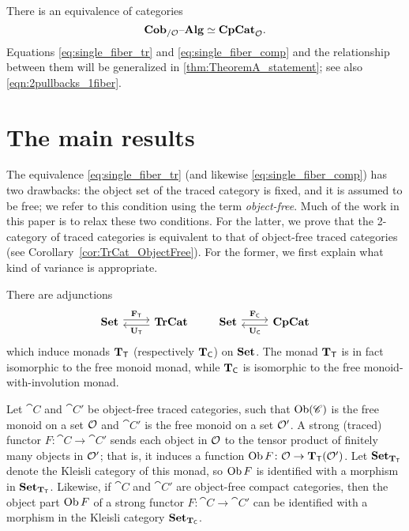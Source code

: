 \documentclass[11pt,oneside,article]{memoir}
\begin{document}
There is an equivalence of categories
\begin{equation}\label{eq:single_fiber_comp}
   \mathbf{Cob}_{/\mathcal{O}}{\text \textendash}\mathbf{Alg}\simeq\mathbf{CpCat}_{\mathcal{O}}.
\end{equation}
Equations \eqref{eq:single_fiber_tr} and \eqref{eq:single_fiber_comp} and the relationship between them will be generalized in \ref{thm:TheoremA_statement}; see also \eqref{eqn:2pullbacks_1fiber}.

\section{The main results}\label{subsec:main_results}

The equivalence \eqref{eq:single_fiber_tr} (and likewise \eqref{eq:single_fiber_comp}) has two
drawbacks: the object set of the traced category is fixed, and it is assumed to be free; we refer to this condition using the term \emph{object-free}. Much of the
work in this paper is to relax these two conditions. For the latter, we prove that the 2-category of
traced categories is equivalent to that of object-free traced categories (see
Corollary~\ref{cor:TrCat_ObjectFree}). For the former, we first explain what kind of variance is
appropriate.

There are adjunctions
\begin{equation*}
   \Adjoint{\Set}{\TrCat}{\FT}{\UT}
   \qquad
   \Adjoint{\Set}{\CompCat}{\FC}{\UC}
\end{equation*}
which induce monads $\mathbf{T}_{\mathsf{T}}$ (respectively $\mathbf{T}_{\mathsf{C}}$) on $\mathbf{Set}$. The monad $\mathbf{T}_{\mathsf{T}}$ is in fact isomorphic to
the free monoid monad, while $\mathbf{T}_{\mathsf{C}}$ is isomorphic to the free monoid-with-involution monad.

Let $\cat{C}$ and $\cat{C}'$ be object-free traced categories, such that $\operatorname{Ob}(\mathscr{C})$ is the free
monoid on a set $\mathcal{O}$ and $\cat{C}'$ is the free monoid on a set $\mathcal{O}'$. A strong (traced)
functor $F\colon \cat{C}\to \cat{C}'$ sends each object in $\mathcal{O}$ to the tensor product of
finitely many objects in $\mathcal{O}'$; that is, it induces a function $\operatorname{Ob}
F\colon\mathcal{O}\to\mathbf{T}_{\mathsf{T}}(\mathcal{O}')$. Let $\mathbf{Set}_{\mathbf{T}_{\mathsf{T}}}$ denote the Kleisli category of this monad, so $\operatorname{Ob}
F$ is identified with a morphism in $\mathbf{Set}_{\mathbf{T}_{\mathsf{T}}}$. Likewise, if $\cat{C}$ and $\cat{C}'$ are object-free compact categories, then the object part $\operatorname{Ob}
F$ of a strong functor $F\colon\cat{C}\to\cat{C}'$ can be identified with a morphism in the Kleisli
category $\mathbf{Set}_{\mathbf{T}_{\mathsf{C}}}$.
\end{document}
